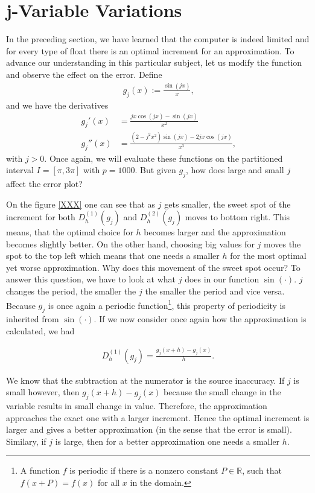 \section{j-Variable Variations}

In the preceding section, we have learned that the computer is indeed limited and for every type of float there is an optimal increment for an approximation. To advance our understanding in this particular subject, let us modify the function and observe the effect on the error. Define
\begin{align*}
    g_j(x) := \frac{\sin(j x)}{x} \text{,}
\end{align*}
and we have the derivatives
\begin{align*}
    g_j'(x) &= \frac{j x \cos(jx) - \sin(jx)}{x^2} \\
    g_j''(x) &= \frac{(2 - j^2 x^2)\sin(jx) - 2 j x \cos(jx)}{x^3} \text{,}
\end{align*}
with \(j > 0\). Once again, we will evaluate these functions on the partitioned interval \(I = [\pi, 3\pi]\) with \(p = 1000\). But given \(g_j\), how does large and small \(j\) affect the error plot?


On the figure \ref{XXX} one can see that as \(j\) gets smaller, the sweet spot of the increment for both \(D^{(1)}_h(g_j)\) and \(D^{(2)}_h(g_j)\) moves to bottom right. This means, that the optimal choice for \(h\) becomes larger and the approximation becomes slightly better. On the other hand, choosing big values for \(j\) moves the spot to the top left which means that one needs a smaller \(h\) for the most optimal yet worse approximation.
Why does this movement of the sweet spot occur? To answer this question, we have to look at what \(j\) does in our function \(\sin(\cdot)\). \(j\) changes the period, the smaller the \(j\) the smaller the period and vice versa. Because \(g_j\) is once again a periodic function\footnote{A function \(f\) is periodic if there is a nonzero constant \(P \in \mathbb{R}\), such that \(f(x + P) = f(x)\) for all \(x\) in the domain.}, this property of periodicity is inherited from \(\sin(\cdot)\). If we now consider once again how the approximation is calculated, we had

\begin{align*}
    D^{(1)}_h (g_j) = \frac{g_j(x + h) - g_j(x)}{h} \text{.}
\end{align*}

We know that the subtraction at the numerator is the source inaccuracy. If \(j\) is small however, then \(g_j(x + h) - g_j(x)\) because the small change in the variable results in small change in value. Therefore, the approximation approaches the exact one with a larger increment. Hence the optimal increment is larger and gives a better approximation (in the sense that the error is small). Similary, if \(j\) is large, then for a better approximation one needs a smaller \(h\).